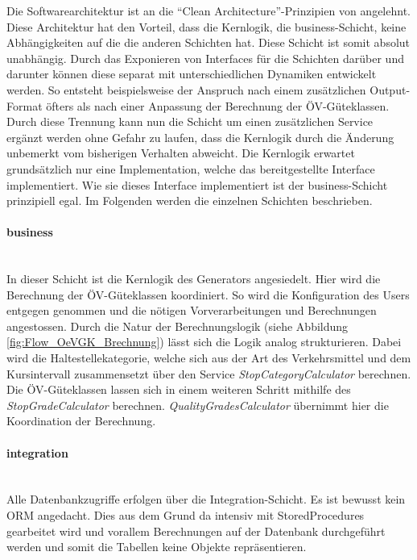 Die Softwarearchitektur ist an die "`Clean Architecture"'-Prinzipien von \cite{martin_clean_architecture} angelehnt.
Diese Architektur hat den Vorteil, dass die Kernlogik, die business-Schicht, keine Abhängigkeiten auf die die anderen Schichten hat.
Diese Schicht ist somit absolut unabhängig.
Durch das Exponieren von Interfaces für die Schichten darüber und darunter können diese separat mit unterschiedlichen Dynamiken entwickelt werden.
So entsteht beispielsweise der Anspruch nach einem zusätzlichen Output-Format öfters als nach einer Anpassung der Berechnung der \acs{ÖV}-Güteklassen.
Durch diese Trennung kann nun die Schicht  um einen zusätzlichen Service ergänzt werden ohne Gefahr zu laufen, dass die Kernlogik durch die Änderung unbemerkt vom bisherigen Verhalten abweicht.
Die Kernlogik erwartet grundsätzlich nur eine Implementation, welche das bereitgestellte Interface implementiert.
Wie sie dieses Interface implementiert ist der business-Schicht prinzipiell egal.
Im Folgenden werden die einzelnen Schichten beschrieben.

\paragraph{business}~\\
\label{layer:business}
In dieser Schicht ist die Kernlogik des Generators angesiedelt.
Hier wird die Berechnung der \acs{ÖV}-Güteklassen koordiniert.
So wird die Konfiguration des Users entgegen genommen und die nötigen Vorverarbeitungen und Berechnungen angestossen.
Durch die Natur der Berechnungslogik (siehe Abbildung \ref{fig:Flow_OeVGK_Brechnung}) lässt sich die Logik analog strukturieren.
Dabei wird die Haltestellekategorie, welche sich aus der Art des Verkehrsmittel und dem Kursintervall zusammensetzt über den Service \emph{StopCategoryCalculator} berechnen.
Die \acs{ÖV}-Güteklassen lassen sich in einem weiteren Schritt mithilfe des \emph{StopGradeCalculator} berechnen.
\emph{QualityGradesCalculator} übernimmt hier die Koordination der Berechnung.

\paragraph{integration}~\\
\label{layer:integration}
Alle Datenbankzugriffe erfolgen über die Integration-Schicht.
Es ist bewusst kein \acl{ORM} angedacht.
Dies aus dem Grund da intensiv mit StoredProcedures gearbeitet wird und vorallem Berechnungen auf der Datenbank durchgeführt werden und somit die Tabellen keine Objekte repräsentieren.

